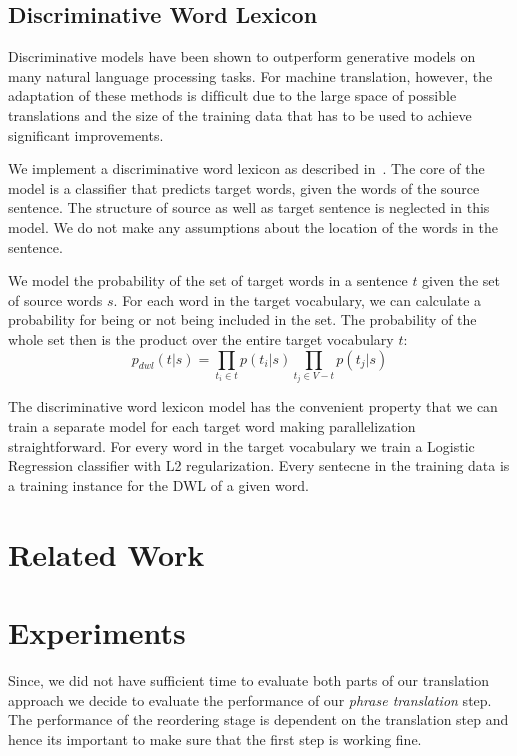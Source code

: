 \documentclass[11pt]{article}
\numberwithin{equation}{section}
\begin{document}
\subsection{Discriminative Word Lexicon}
\label{sec:dwl}

Discriminative models have been shown to outperform generative models on many natural language processing tasks. For machine 
translation, however, the adaptation of these methods is difﬁcult due to the large space of possible translations and the size of the 
training data that has to be used to achieve signiﬁcant improvements. 

We implement a discriminative word lexicon as described in~\cite{Mauser:2009:ESM:1699510.1699538}.
The core of the model is a classiﬁer that predicts target words, given the words of the source
sentence. The structure of source as well as target sentence is neglected in this model. We do
not make any assumptions about the location of the words in the sentence.

We model the probability of the set of target
words in a sentence $t$ given the set of source words
$s$. For each word in the target vocabulary, we can
calculate a probability for being or not being included in the set. The probability of the whole set
then is the product over the entire target vocabulary $t$:
\[
p_{dwl}(t|s) = \prod_{t_i \in t} p(t_i|s) \prod_{t_j \in V-t} p(t_j|s)
\]

The discriminative word lexicon model has the
convenient property that we can train a separate
model for each target word making parallelization straightforward.
For every word in the target vocabulary we train a Logistic Regression classifier with L2 regularization.
Every sentecne in the training data is a training instance for the DWL of a given word.

\section{Related Work}
\label{sec:relatedWork}

\section{Experiments}
\label{sec:experiments}

Since, we did not have sufficient time to evaluate both parts of our translation approach we decide to evaluate
the performance of our \textit{phrase translation} step. The performance of the reordering stage is dependent
on the translation step and hence its important to make sure that the first step is working fine.
\end{document}
